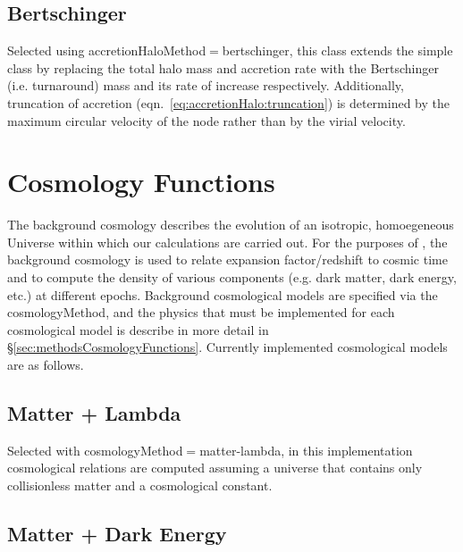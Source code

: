 \subsection{Bertschinger}\label{phys:accretionHalo:accretionHaloBertschinger}

Selected using {\normalfont \ttfamily accretionHaloMethod}$=${\normalfont \ttfamily bertschinger}, this class extends the {\normalfont \ttfamily simple} class by replacing the total halo mass and accretion rate with the Bertschinger (i.e. turnaround) mass and its rate of increase respectively. Additionally, truncation of accretion (eqn.~\ref{eq:accretionHalo:truncation}) is determined by the maximum circular velocity of the node rather than by the virial velocity.

\section{Cosmology Functions}

The background cosmology describes the evolution of an isotropic, homoegeneous Universe within which our calculations are carried out. For the purposes of \glc, the background cosmology is used to relate expansion factor/redshift to cosmic time and to compute the density of various components (e.g. dark matter, dark energy, etc.) at different epochs. Background cosmological models are specified via the {\normalfont \ttfamily cosmologyMethod}, and the physics that must be implemented for each cosmological model is describe in more detail in \S\ref{sec:methodsCosmologyFunctions}. Currently implemented cosmological models are as follows.

\subsection{Matter + Lambda}\label{phys:cosmologyFunctions:cosmologyFunctionsMatterLambda}

Selected with {\normalfont \ttfamily cosmologyMethod}$=${\normalfont \ttfamily matter-lambda}, in this implementation cosmological relations are computed assuming a universe that contains only collisionless matter and a cosmological constant.

\subsection{Matter + Dark Energy}\label{phys:cosmologyFunctions:cosmologyFunctionsMatterDarkEnergy}

